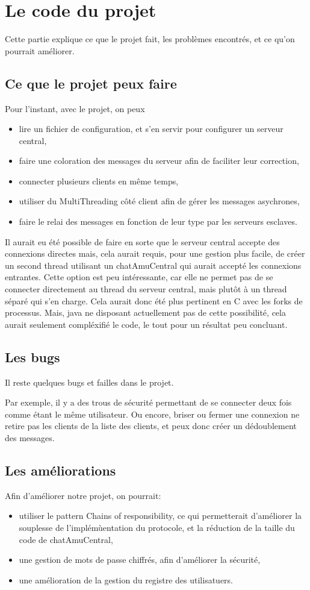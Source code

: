 \section{Le code du projet}
Cette partie explique ce que le projet fait, les problèmes encontrés, et ce qu'on pourrait améliorer.

\subsection{Ce que le projet peux faire}
Pour l'instant, avec le projet, on peux
\begin{itemize}
	\item lire un fichier de configuration, et s'en servir pour configurer un serveur central,
	\item faire une coloration des messages du serveur afin de faciliter leur correction,
	\item connecter plusieurs clients en même temps,
	\item utiliser du MultiThreading côté client afin de gérer les messages asychrones,
	\item faire le relai des messages en fonction de leur type par les serveurs esclaves.
\end{itemize}

Il aurait eu été possible de faire en sorte que le serveur central accepte des connexions directes mais, cela aurait requis, pour une gestion plus facile, de créer un second thread utilisant un chatAmuCentral qui aurait accepté les connexions entrantes.
Cette option est peu intéressante, car elle ne permet pas de se connecter directement au thread du serveur central, mais plutôt à un thread séparé qui s'en charge.
Cela aurait donc été plus pertinent en C avec les forks de processus. Mais, java ne disposant actuellement pas de cette possibilité, cela aurait seulement compléxifié le code, le tout pour un résultat peu concluant.

\subsection{Les bugs}
Il reste quelques bugs et failles dans le projet.

Par exemple, il y a des trous de sécurité permettant de se connecter deux fois comme étant le même utilisateur.
Ou encore, briser ou fermer une connexion ne retire pas les clients de la liste des clients, et peux donc créer un dédoublement des messages.

\subsection{Les améliorations}
Afin d'améliorer notre projet, on pourrait:
\begin{itemize}
	\item utiliser le pattern Chains of responsibility, ce qui permetterait d'améliorer la souplesse de l'implémùentation du protocole, et la réduction de la taille du code de chatAmuCentral,
	\item une gestion de mots de passe chiffrés, afin d'améliorer la sécurité,
	\item une amélioration de la gestion du registre des utilisatuers.
\end{itemize}
